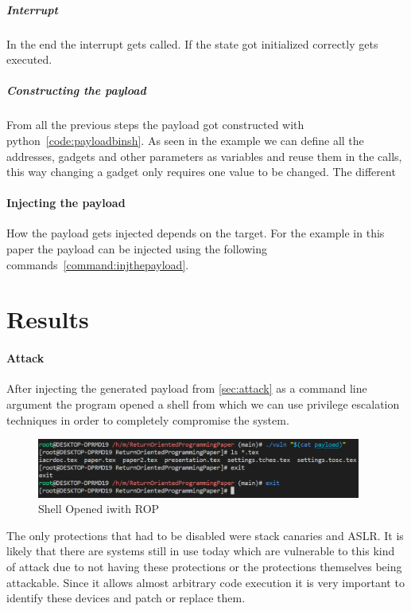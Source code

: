 \documentclass[journal=tosc,submission, notanonymous]{iacrtrans}
\begin{document}
\subparagraph{Interrupt}
In the end the  interrupt gets called. If the state got initialized correctly  gets executed.
\subparagraph{Constructing the payload}
From all the previous steps the payload got constructed with python~\cref{code:payloadbinsh}. As seen in the example we can define all the addresses, gadgets and other parameters as variables and reuse them in the  calls, this way changing a gadget only requires one value to be changed. The different
\paragraph{Injecting the payload}
\label{par:injthepayload}
How the payload gets injected depends on the target. For the example in this paper the payload can be injected using the following commands~\cref{command:injthepayload}.
\section{Results}
\paragraph{Attack}
After injecting the generated payload from \cref{sec:attack} as a command line argument the program opened a shell from which we can use privilege escalation techniques in order to completely compromise the system.
\begin{figure}[h]
  \centering
  \includegraphics[width=0.95\textwidth]{ROPdone.png}
  \caption{Shell Opened iwith ROP}
  \label{fig:success}
\end{figure}
The only protections that had to be disabled were stack canaries and ASLR. It is likely that there are systems still in use today which are vulnerable to this kind of attack due to not having these protections or the protections themselves being attackable. Since it allows almost arbitrary code execution it is very important to identify these devices and patch or replace them.
\end{document}
